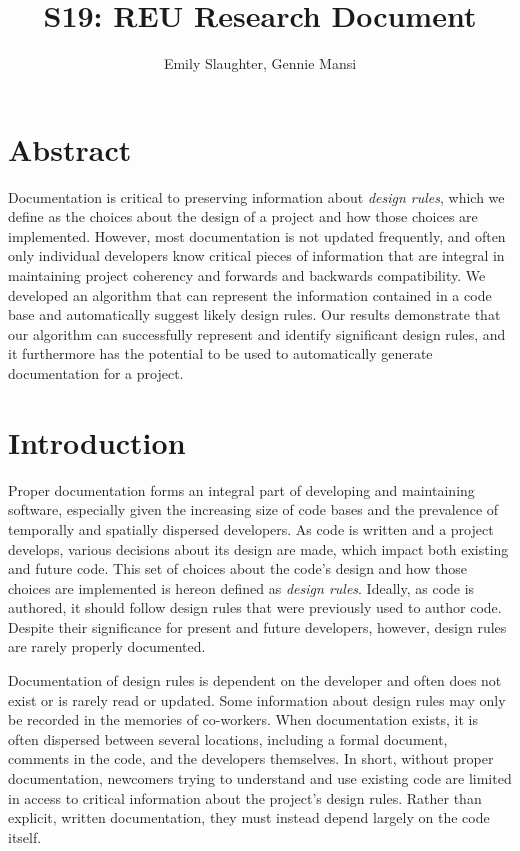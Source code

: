 \documentclass[12pt]{article}
\title{S19: REU Research Document}
\author{Emily Slaughter, Gennie Mansi }
\begin{document}
\maketitle

\clearpage

\tableofcontents

\clearpage

\section{Abstract} \label{abstract}

Documentation is critical to preserving information about \textit{design rules}, which we define as the choices about the design of a project and how those choices are implemented. However, most documentation is not updated frequently, and often only individual developers know critical pieces of information that are integral in maintaining project coherency and forwards and backwards compatibility.  We developed an algorithm that can represent the information contained in a code base and automatically suggest likely design rules. Our results demonstrate that our algorithm can successfully represent and identify significant design rules, and it furthermore has the potential to be used to automatically generate documentation for a project.



\clearpage
\section{Introduction} \label{intro}

Proper documentation forms an integral part of developing and maintaining software, especially given the increasing size of code bases and the prevalence of temporally and spatially dispersed developers. As code is written and a project develops, various decisions about its design are made, which impact both existing and future code. This set of choices about the code's design and how those choices are implemented is hereon defined as  \textit{design rules}. Ideally, as code is authored, it should follow design rules that were previously used to author code. Despite their significance for present and future developers, however, design rules are rarely properly documented.

Documentation of design rules is dependent on the developer and often does not exist or is rarely read or updated. Some information about design rules may only be recorded in the memories of co-workers. When documentation exists, it is often dispersed between several locations, including a formal document, comments in the code, and the developers themselves. In short, without proper documentation, newcomers trying to understand and use existing code are limited in access to critical information about the project's design rules. Rather than explicit, written documentation, they must instead depend largely on the code itself.
\end{document}
